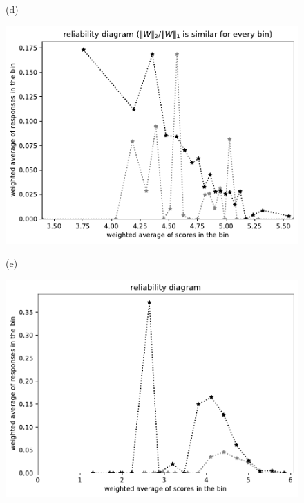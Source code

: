 \documentclass{article}
\newlength{\vertsep}
\newlength{\imsize}
\begin{document}
\begin{figure}
\begin{centering}
(d)
\parbox{\imsize}{\includegraphics[width=\imsize]
{../codes/weighted/County_of_Riverside_vs_Butte-LNGI/equierrs20.pdf}}
\quad\quad
(e)
\parbox{\imsize}{\includegraphics[width=\imsize]
{../codes/weighted/County_of_Riverside_vs_Butte-LNGI/equiscores20.pdf}}

\vspace{\vertsep}


\end{centering}
\end{figure}
\end{document}

